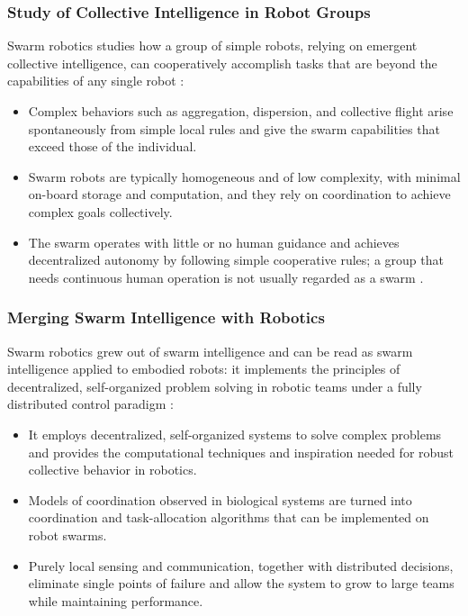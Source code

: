 \subsubsection{Study of Collective Intelligence in Robot Groups}

Swarm robotics studies how a group of simple robots, relying on emergent
collective intelligence, can cooperatively accomplish tasks that are beyond the
capabilities of any single robot \cite{tan2013research,sahin2005swarm}:
\begin{itemize}
  \item {} Complex behaviors such as aggregation,
        dispersion, and collective flight arise spontaneously from simple local
        rules and give the swarm capabilities that exceed those of the individual.
  \item {} Swarm robots are typically homogeneous and of low
        complexity, with minimal on-board storage and computation, and they rely
        on coordination to achieve complex goals collectively.
  \item {} The swarm operates with little or no human
        guidance and achieves decentralized autonomy by following simple
        cooperative rules; a group that needs continuous human operation is not
        usually regarded as a swarm \cite{shahzad2023review}.
\end{itemize}

\subsubsection{Merging Swarm Intelligence with Robotics}

Swarm robotics grew out of swarm intelligence and can be read as swarm
intelligence applied to embodied robots: it implements the principles of
decentralized, self-organized problem solving in robotic teams under a fully
distributed control paradigm \cite{dias2021swarm,nguyen2024swarm,hamann2008space}:
\begin{itemize}
  \item {} It employs decentralized,
        self-organized systems to solve complex problems and provides the
        computational techniques and inspiration needed for robust collective
        behavior in robotics.
  \item {} Models of coordination
        observed in biological systems are turned into coordination and
        task-allocation algorithms that can be implemented on robot swarms.
  \item {} Purely local sensing and
        communication, together with distributed decisions, eliminate single
        points of failure and allow the system to grow to large teams while
        maintaining performance.
\end{itemize}

